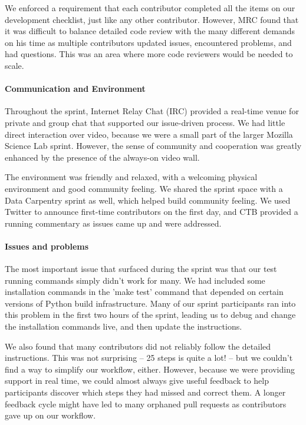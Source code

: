\documentclass[11pt]{article}
\begin{document}
We enforced a requirement that each contributor completed all the
items on our development checklist, just like any other contributor.
However, MRC found that it was difficult to balance detailed code
review with the many different demands on his time as multiple
contributors updated issues, encountered problems, and had questions.
This was an area where more code reviewers would be needed to scale.

\paragraph{Communication and Environment} Throughout the sprint, Internet Relay Chat (IRC) provided a real-time
venue for private and group chat that supported our issue-driven
process.  We had little direct interaction over video, because we were
a small part of the larger Mozilla Science Lab sprint.  However, the
sense of community and cooperation was greatly enhanced by the
presence of the always-on video wall.

The environment was friendly and relaxed, with a welcoming physical
environment and good community feeling.  We shared the sprint space
with a Data Carpentry sprint as well, which helped build community feeling.
We used Twitter to announce first-time contributors on the first day, and
CTB provided a running commentary as issues came up and were addressed.

\paragraph{Issues and problems}
The most important issue that surfaced during the sprint was that our
test running commands simply didn't work for many.  We had included
some installation commands in the 'make test' command that depended on
certain versions of Python build infrastructure.  Many of our sprint
participants ran into this problem in the first two hours of the
sprint, leading us to debug and change the installation commands live,
and then update the instructions.

We also found that many contributors did not reliably follow the
detailed instructions.  This was not surprising -- 25 steps is quite a
lot! -- but we couldn't find a way to simplify our workflow, either.
However, because we were providing support in real time, we could
almost always give useful feedback to help participants discover which
steps they had missed and correct them.  A longer feedback cycle might
have led to many orphaned pull requests as contributors gave up on our
workflow.
\end{document}

